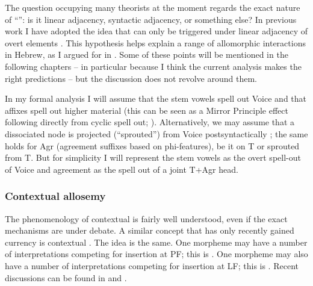 \begin{exe}
\begin{xlist}
\begin{exe}
\begin{exe}
\begin{exe}
\begin{exe}
\begin{xlist}
\begin{exe}
\begin{xlist}
\begin{xlist}
\begin{xlist}
\begin{exe}
\begin{xlist}
\begin{exe}
\begin{exe}
\begin{xlist}
\begin{exe}
\begin{xlist}
\begin{exe}
\begin{exe}
\begin{xlist}
\begin{exe}
\begin{xlist}
\begin{exe}
\begin{xlist}
\begin{exe}
\begin{exe}
\begin{xlist}
\begin{exe}
\begin{exe}
\begin{xlist}
\begin{exe}
\begin{xlist}
The question occupying many theorists at the moment regards the exact nature of ``\trace'': is it linear adjacency, syntactic adjacency, or something else? In previous work I have adopted the idea that  can only be triggered under linear adjacency of overt elements \citep{embick10,marantz13}. This hypothesis helps explain a range of allomorphic interactions in Hebrew, as I argued for in \cite{kastner18nllt}. Some of these points will be mentioned in the following chapters -- in particular because I think the current analysis makes the right predictions -- but the discussion does not revolve around them.

In my formal analysis I will assume that the stem vowels spell out Voice and that affixes spell out higher material (this can be seen as a Mirror Principle effect following directly from cyclic spell out; \citealt{baker85,muysken88,katie13,zukoff16nels,kastner18nllt}). Alternatively, we may assume that a dissociated  node is projected (``sprouted'') from Voice postsyntactically \citep{oltramassuet99,embick10}; the same holds for Agr (agreement suffixes based on phi-features), be it on T or sprouted from T. But for simplicity I will represent the stem vowels as the overt spell-out of Voice and agreement as the spell out of a joint T+Agr head.

		\subsubsection{Contextual allosemy}
The phenomenology of contextual  is fairly well understood, even if the exact mechanisms are under debate. A similar concept that has only recently gained currency is contextual \emph{}. The idea is the same. One morpheme may have a number of interpretations competing for insertion at PF; this is . One morpheme may also have a number of interpretations competing for insertion at LF; this is . Recent discussions can be found in \cite{woodmarantz17} and \cite{mylermarantz19cup}.


\end{xlist}
\end{exe}
\end{xlist}
\end{exe}
\end{exe}
\end{xlist}
\end{exe}
\end{exe}
\end{xlist}
\end{exe}
\end{xlist}
\end{exe}
\end{xlist}
\end{exe}
\end{exe}
\end{xlist}
\end{exe}
\end{xlist}
\end{exe}
\end{exe}
\end{xlist}
\end{exe}
\end{xlist}
\end{xlist}
\end{xlist}
\end{exe}
\end{xlist}
\end{exe}
\end{exe}
\end{exe}
\end{exe}
\end{xlist}
\end{exe}
